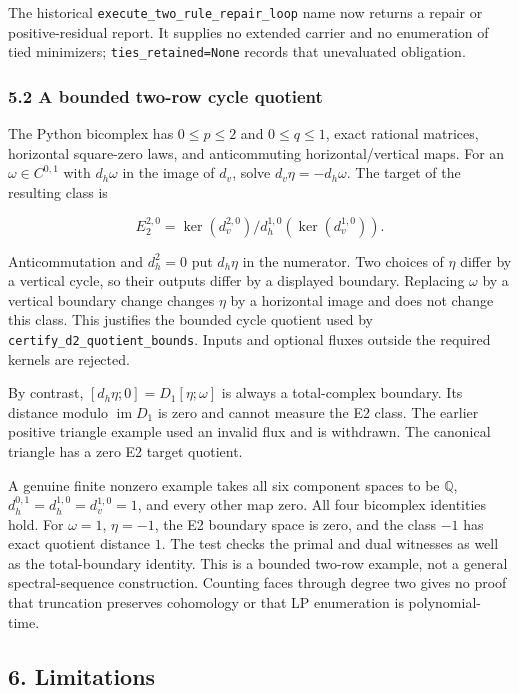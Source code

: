\documentclass[
  11pt,
]{article}
\begin{document}
The historical \nolinkurl{execute_two_rule_repair_loop} name now returns a repair or positive-residual report. It supplies no extended carrier and no enumeration of tied minimizers; \texttt{ties\_retained=None} records that unevaluated obligation.

\subsubsection{5.2 A bounded two-row cycle quotient}\label{a-bounded-two-row-cycle-quotient}

The Python bicomplex has \(0\le p\le2\) and \(0\le q\le1\), exact rational matrices, horizontal square-zero laws, and anticommuting horizontal/vertical maps. For an \(\omega\in C^{0,1}\) with \(d_h\omega\) in the image of \(d_v\), solve \(d_v\eta=-d_h\omega\). The target of the resulting class is

\[E_2^{2,0}=\ker(d_v^{2,0})/d_h^{1,0}(\ker(d_v^{1,0})).\]

Anticommutation and \(d_h^2=0\) put \(d_h\eta\) in the numerator. Two choices of \(\eta\) differ by a vertical cycle, so their outputs differ by a displayed boundary. Replacing \(\omega\) by a vertical boundary change changes \(\eta\) by a horizontal image and does not change this class. This justifies the bounded cycle quotient used by \nolinkurl{certify_d2_quotient_bounds}. Inputs and optional fluxes outside the required kernels are rejected.

By contrast, \([d_h\eta;0]=D_1[\eta;\omega]\) is always a total-complex boundary. Its distance modulo \(\operatorname{im}D_1\) is zero and cannot measure the E2 class. The earlier positive triangle example used an invalid flux and is withdrawn. The canonical triangle has a zero E2 target quotient.

A genuine finite nonzero example takes all six component spaces to be \(\mathbb Q\), \(d_h^{0,1}=d_h^{1,0}=d_v^{1,0}=1\), and every other map zero. All four bicomplex identities hold. For \(\omega=1\), \(\eta=-1\), the E2 boundary space is zero, and the class \(-1\) has exact quotient distance \(1\). The test checks the primal and dual witnesses as well as the total-boundary identity. This is a bounded two-row example, not a general spectral-sequence construction. Counting faces through degree two gives no proof that truncation preserves cohomology or that LP enumeration is polynomial-time.

\subsection{6. Limitations}\label{limitations}
\end{document}
